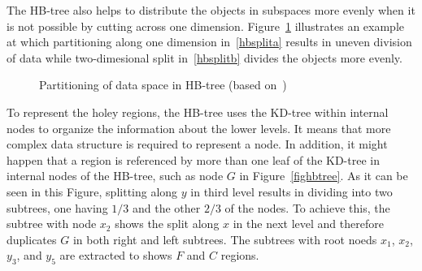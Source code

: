 \documentclass[a4paper,12pt]{article}
\begin{document}
The HB-tree also helps to distribute the objects in subspaces more evenly when it is not possible by cutting across one dimension. Figure~\ref{hbtree} illustrates an example at which partitioning along one dimension in~\ref{hbsplita} results in uneven division of data while two-dimesional split in~\ref{hbsplitb} divides the objects more evenly.

\begin{figure}
\centering
{}
\centering
{}
\caption{Partitioning of data space in HB-tree (based on~\cite{tree-basedindexes})}
\label{hbtree}
\end{figure}

To represent the holey regions, the HB-tree uses the KD-tree within internal nodes to organize the information about the lower levels. It means that more complex data structure is required to represent a node. In addition, it might happen that a region is referenced by more than one leaf of the KD-tree in internal nodes of the HB-tree, such as node $G$ in Figure~\ref{fighbtree}. As it can be seen in this Figure, splitting along $y$ in third level results in dividing into two subtrees, one having $1/3$ and the other $2/3$ of the nodes. To achieve this, the subtree with node $x_2$ shows the split along $x$ in the next level and therefore duplicates $G$ in both right and left subtrees. The subtrees with root noeds $x_1$, $x_2$, $y_3$, and $y_5$ are extracted to shows $F$ and $C$ regions.
\end{document}
